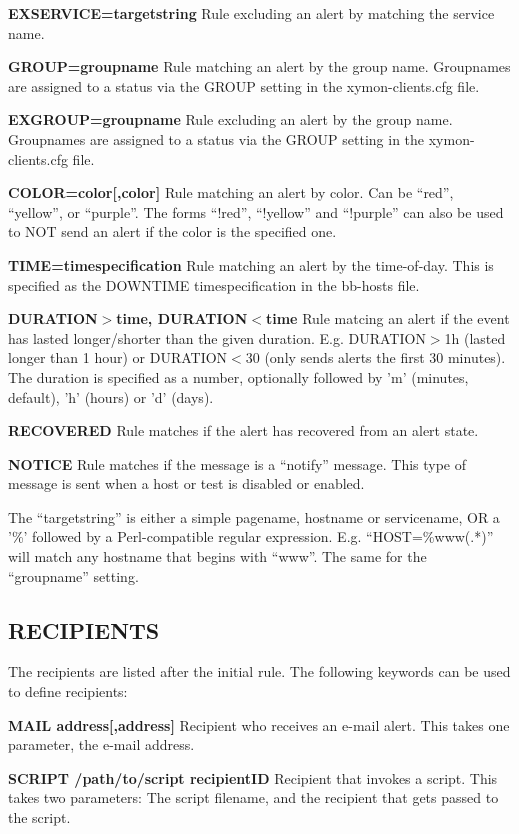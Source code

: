  \textbf{EXSERVICE=targetstring}
 Rule excluding an alert by matching the service name. 


 \textbf{GROUP=groupname}
 Rule matching an alert by the group name. Groupnames are assigned to a status via the GROUP setting in the xymon-clients.cfg file. 


 \textbf{EXGROUP=groupname}
 Rule excluding an alert by the group name. Groupnames are assigned to a status via the GROUP setting in the xymon-clients.cfg file. 


 \textbf{COLOR=color[,color]}
 Rule matching an alert by color. Can be ``red'', ``yellow'', or ``purple''. The forms ``!red'', ``!yellow'' and ``!purple'' can also be used to NOT send an alert if the color is the specified one. 


 \textbf{TIME=timespecification}
 Rule matching an alert by the time-of-day. This is specified as the DOWNTIME timespecification in the bb-hosts file. 


 \textbf{DURATION$>$time, DURATION$<$time}
 Rule matcing an alert if the event has lasted longer/shorter than the given duration. E.g. DURATION$>$1h (lasted longer than 1 hour) or DURATION$<$30 (only sends alerts the first 30 minutes). The duration is specified as a number, optionally followed by 'm' (minutes, default), 'h' (hours) or 'd' (days). 


 \textbf{RECOVERED}
 Rule matches if the alert has recovered from an alert state. 


 \textbf{NOTICE}
 Rule matches if the message is a ``notify'' message. This type of message is sent when a host or test is disabled or enabled. 


  The ``targetstring'' is either a simple pagename, hostname or servicename, OR a '\%' followed by a Perl-compatible regular expression. E.g. ``HOST=\%www(.*)'' will match any hostname that begins with ``www''. The same for the ``groupname'' setting. 


 
\subsection{RECIPIENTS}
 The recipients are listed after the initial rule. The following keywords can be used to define recipients: 

 \textbf{MAIL address[,address]}
 Recipient who receives an e-mail alert. This takes one parameter, the e-mail address. 


 \textbf{SCRIPT /path/to/script recipientID}
 Recipient that invokes a script. This takes two parameters: The script filename, and the recipient that gets passed to the script. 


